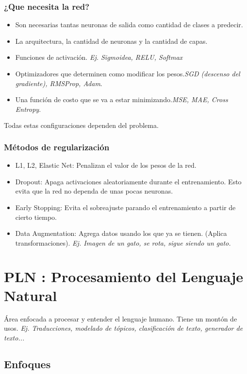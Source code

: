 \documentclass[titlepage,a4paper]{article}
\begin{document}
\subsubsection*{¿Que necesita la red?}
\begin{itemize}
    \item Son necesarias tantas neuronas de salida como cantidad de clases a predecir.
    \item La arquitectura, la cantidad de neuronas y la cantidad de capas.
    \item Funciones de activación. \textit{Ej. Sigmoidea, RELU, Softmax}
    \item Optimizadores que determinen como modificar los pesos.\textit{SGD (descenso del gradiente), RMSProp, Adam}.
    \item Una función de costo que se va a estar minimizando.\textit{MSE, MAE, Cross Entropy}.
\end{itemize}

Todas estas configuraciones dependen del problema. 

\subsubsection*{Métodos de regularización}
\begin{itemize}
    \item L1, L2, Elastic Net: Penalizan el valor de los pesos de la red.
    \item Dropout: Apaga activaciones aleatoriamente durante el entrenamiento. Esto evita que la red no dependa de unas pocas neuronas.
    \item Early Stopping: Evita el sobreajuste parando el entrenamiento a partir de cierto tiempo.
    \item Data Augmentation: Agrega datos usando los que ya se tienen. (Aplica transformaciones). \textit{Ej. Imagen de un gato, se rota, sigue siendo un gato.}
\end{itemize}


\newpage

\section{PLN : Procesamiento del Lenguaje Natural}
Área enfocada a procesar y entender el lenguaje humano. Tiene un montón de usos. \textit{Ej. Traducciones, modelado de tópicos, clasificación de texto, generador de texto...}

\subsection{Enfoques}
\end{document}
